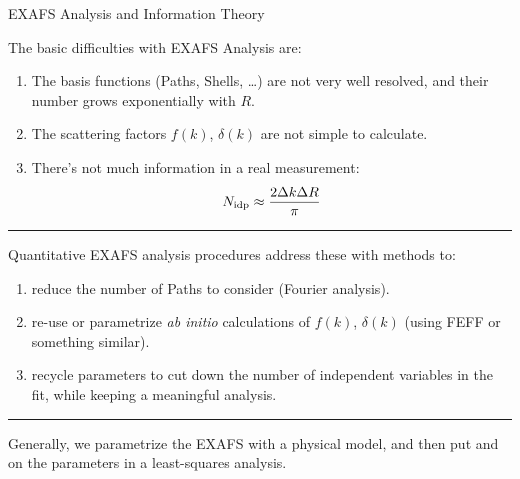 \begin{slide}{EXAFS Analysis and Information Theory}
    
    The basic difficulties with EXAFS Analysis are:

    \begin{enumerate}
    \item The basis functions (Paths, Shells, \ldots) are not very well
      resolved, and their number grows exponentially with $R$.

    \item The scattering factors $f(k)$, $\delta(k)$ are not simple to
      calculate.
      
    \item There's not much information in a real measurement:
      \[ N_{\rm idp} \approx \frac{2\Delta k\Delta R}{\pi} \]
      
    \end{enumerate}
    
    \hrule \vmm
    
    Quantitative EXAFS analysis procedures address these with methods to:
    
    \begin{enumerate}
    \item {reduce} the number of Paths to consider (Fourier analysis).

    \item re-use or parametrize {\emph{ab initio}} calculations of
      $f(k)$, $\delta(k)$ (using {\scshape{FEFF}} or something similar).
      
      
    \item recycle parameters to cut down the number of independent
      variables in the fit, while keeping a meaningful analysis.
      
    \end{enumerate}

    \hrule \vmm
    
    Generally, we parametrize the EXAFS with a physical model, and then
    put {} and {} on the
    parameters in a least-squares analysis.

    \vmm
\vfill
\end{slide} 

